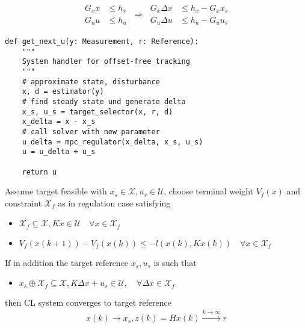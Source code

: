 

\begin{align*}
	\begin{aligned}
		G_x  x & \leq h_x \\
		G_u  u & \leq h_u
	\end{aligned}
	\ \Rightarrow \
	\begin{aligned}
		G_x \Delta x & \leq h_x - G_x x_s \\
		G_u \Delta u & \leq h_u - G_u u_s
	\end{aligned}
\end{align*}


\begin{lstlisting}[style=sst]
def get_next_u(y: Measurement, r: Reference):
    """
    System handler for offset-free tracking
    """
    # approximate state, disturbance
    x, d = estimator(y)
    # find steady state und generate delta
    x_s, u_s = target_selector(x, r, d)
    x_delta = x - x_s
    # call solver with new parameter
    u_delta = mpc_regulator(x_delta, x_s, u_s)
    u = u_delta + u_s

    return u
\end{lstlisting}



Assume target feasible with $x_s \in \mathcal{X}, u_s \in \mathcal{U}$,
choose terminal weight $V_f(x)$ and constraint $\mathcal{X}_f$ as in regulation case satisfying
\begin{itemize}[leftmargin=1em]
	\item $\mathcal{X}_f \subseteq \mathcal{X}, K x \in \mathcal{U} \quad \forall x \in \mathcal{X}_f$
	\item $V_f(x(k+1)) - V_f(x(k)) \leq -l (x(k), Kx(k)) \quad \forall x \in \mathcal{X}_f$
\end{itemize}
If in addition the target reference $x_s, u_s$ is such that
\begin{itemize}[leftmargin=1em]
	\item $x_s \oplus \mathcal{X}_f \subseteq \mathcal{X}, K\Delta x + u_s \in \mathcal{U}, \quad \forall \Delta x \in \mathcal{X}_f$
\end{itemize}
then CL system converges to target reference
\begin{align*}
	x(k) \to x_s, z(k) = Hx(k) \xrightarrow{k\to\infty}r
\end{align*}

